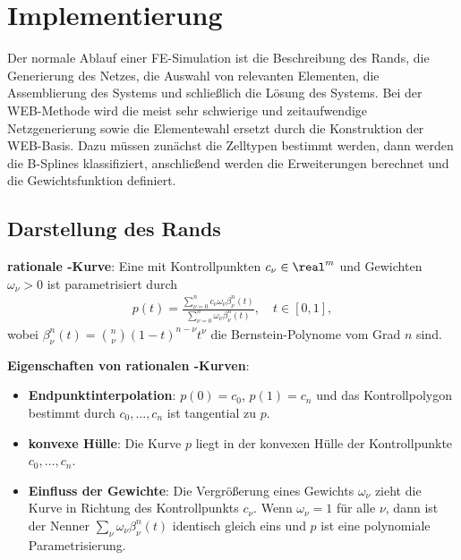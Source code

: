 \chapter{%
    Implementierung%
}

Der normale Ablauf einer FE-Simulation ist
die Beschreibung des Rands,
die Generierung des Netzes,
die Auswahl von relevanten Elementen,
die Assemblierung des Systems und
schließlich die Lösung des Systems.
Bei der WEB-Methode wird die
meist sehr schwierige und zeitaufwendige Netzgenerierung sowie die Elementewahl
ersetzt durch die Konstruktion der WEB-Basis.
Dazu müssen zunächst die Zelltypen bestimmt werden,
dann werden die B-Splines klassifiziert,
anschließend werden die Erweiterungen berechnet und
die Gewichtsfunktion definiert.

\section{%
    Darstellung des Rands%
}

\textbf{rationale -Kurve}:
Eine  mit Kontrollpunkten $c_\nu \in \real^m$ und
Gewichten $\omega_\nu > 0$ ist parametrisiert durch
\begin{align*}
    p(t) = \frac{\sum_{\nu=0}^n c_\nu \omega_\nu \beta_\nu^n(t)}
    {\sum_{\nu=0}^n \omega_\nu \beta_\nu^n(t)},\quad
    t \in [0, 1],
\end{align*}
wobei $\beta_\nu^n(t) = \binom{n}{\nu} (1 - t)^{n-\nu} t^\nu$ die Bernstein-Polynome vom Grad $n$
sind.

\textbf{Eigenschaften von rationalen -Kurven}:
\begin{itemize}
    \item
    \textbf{Endpunktinterpolation}:
    $p(0) = c_0$,
    $p(1) = c_n$ und
    das Kontrollpolygon bestimmt durch $c_0, \dotsc, c_n$
    ist tangential zu $p$.

    \item
    \textbf{konvexe Hülle}:
    Die Kurve $p$ liegt in der konvexen Hülle der Kontrollpunkte $c_0, \dotsc, c_n$.

    \item
    \textbf{Einfluss der Gewichte}:
    Die Vergrößerung eines Gewichts $\omega_\nu$ zieht die Kurve in Richtung des Kontrollpunkts
    $c_\nu$.
    Wenn $\omega_\nu = 1$ für alle $\nu$,
    dann ist der Nenner $\sum_\nu \omega_\nu \beta_\nu^n(t)$ identisch gleich eins und
    $p$ ist eine polynomiale Parametrisierung.
\end{itemize}

